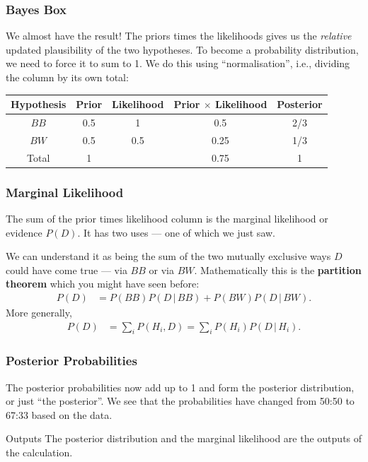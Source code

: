 \documentclass{beamer}
\newcommand{\given}{\,|\,}
\begin{document}
\begin{frame}
\frametitle{Bayes Box}
We almost have the result! The priors times the likelihoods gives us the
{\em relative} updated plausibility of the two hypotheses. To become a
probability distribution, we need to force it to sum to 1. We do this
using ``normalisation'', i.e., dividing the column by its own total:\\[0.5em]\pause
\begin{tabular}{|c|c|c|c|c|}
\hline
Hypothesis & Prior & Likelihood & Prior $\times$ Likelihood & Posterior \\
\hline
$BB$ & 0.5 & 1 & 0.5 & 2/3 \\
$BW$ & 0.5 & 0.5 & 0.25 & 1/3 \\
\hline
Total & 1 & & 0.75 & 1\\
\hline
\end{tabular}\pause



\end{frame}


\begin{frame}
\frametitle{Marginal Likelihood}
The sum of the prior times likelihood column is the marginal likelihood
or evidence $P(D)$. It has two uses --- one of which we just saw.\\[0.5em]\pause

We can understand it as being the sum of the two mutually exclusive ways
$D$ could have come true --- via $BB$ or via $BW$. Mathematically this is
the {\bf partition theorem} which you might have seen before:
\begin{align}
P(D) &= P(BB)P(D \given BB) + P(BW)P(D \given BW).
\end{align}
\pause
More generally,
\begin{align}
P(D) &= \sum_i P(H_i, D) = \sum_i P(H_i)P(D \given H_i).
\end{align}

\end{frame}


\begin{frame}
\frametitle{Posterior Probabilities}
The posterior probabilities now add up to 1 and form the posterior distribution,
or just ``the posterior''. We see that the probabilities have changed from
50:50 to 67:33 based on the data.\pause

\begin{alertblock}{Outputs}
The posterior distribution and the marginal likelihood are the outputs of the
calculation.
\end{alertblock}

\end{frame}
\end{document}
